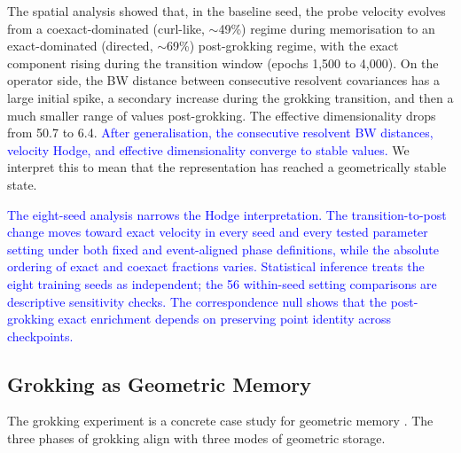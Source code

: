 \documentclass[11pt]{article}
\newcommand{\addedtext}[1]{\textcolor{blue}{#1}}
\theoremstyle{remark}
\begin{document}
The spatial analysis showed that, in the baseline seed, the probe velocity evolves from a coexact-dominated (curl-like, $\sim$49\%) regime during memorisation to an exact-dominated (directed, $\sim$69\%) post-grokking regime, with the exact component rising during the transition window (epochs 1{,}500 to 4{,}000). On the operator side, the BW distance between consecutive resolvent covariances has a large initial spike, a secondary increase during the grokking transition, and then a much smaller range of values post-grokking. The effective dimensionality drops from 50.7 to 6.4. \addedtext{After generalisation, the consecutive resolvent BW distances, velocity Hodge, and effective dimensionality converge to stable values.} We interpret this to mean that the representation has reached a geometrically stable state.

\addedtext{The eight-seed analysis narrows the Hodge interpretation. The transition-to-post change moves toward exact velocity in every seed and every tested parameter setting under both fixed and event-aligned phase definitions, while the absolute ordering of exact and coexact fractions varies. Statistical inference treats the eight training seeds as independent; the 56 within-seed setting comparisons are descriptive sensitivity checks. The correspondence null shows that the post-grokking exact enrichment depends on preserving point identity across checkpoints.}

\subsection{Grokking as Geometric Memory}

The grokking experiment is a concrete case study for geometric memory \citep{noroozizadeh2025geometric}. The three phases of grokking align with three modes of geometric storage.
\end{document}
